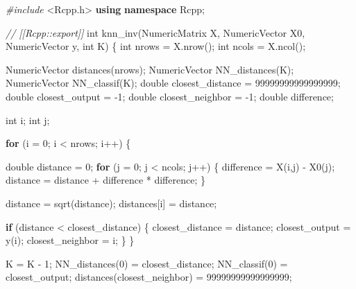 \documentclass[]{article}
\newenvironment{Shaded}{\begin{snugshade}}{\end{snugshade}}
\newcommand{\CommentTok}[1]{\textcolor[rgb]{0.56,0.35,0.01}{\textit{#1}}}
\newcommand{\ControlFlowTok}[1]{\textcolor[rgb]{0.13,0.29,0.53}{\textbf{#1}}}
\newcommand{\DataTypeTok}[1]{\textcolor[rgb]{0.13,0.29,0.53}{#1}}
\newcommand{\DecValTok}[1]{\textcolor[rgb]{0.00,0.00,0.81}{#1}}
\newcommand{\ImportTok}[1]{#1}
\newcommand{\KeywordTok}[1]{\textcolor[rgb]{0.13,0.29,0.53}{\textbf{#1}}}
\newcommand{\NormalTok}[1]{#1}
\newcommand{\PreprocessorTok}[1]{\textcolor[rgb]{0.56,0.35,0.01}{\textit{#1}}}
\begin{document}
\begin{Shaded}
\begin{Highlighting}[]
\PreprocessorTok{#include }\ImportTok{<Rcpp.h>}
\KeywordTok{using} \KeywordTok{namespace}\NormalTok{ Rcpp;}

\CommentTok{// [[Rcpp::export]]}
\DataTypeTok{int}\NormalTok{ knn_inv(NumericMatrix X, NumericVector X0, NumericVector y, }\DataTypeTok{int}\NormalTok{ K) \{}
    \DataTypeTok{int}\NormalTok{ nrows = X.nrow();}
    \DataTypeTok{int}\NormalTok{ ncols = X.ncol();}

\NormalTok{    NumericVector distances(nrows);}
\NormalTok{    NumericVector NN_distances(K);}
\NormalTok{    NumericVector NN_classif(K);}
    \DataTypeTok{double}\NormalTok{ closest_distance = }\DecValTok{99999999999999999}\NormalTok{;}
    \DataTypeTok{double}\NormalTok{ closest_output = -}\DecValTok{1}\NormalTok{;}
    \DataTypeTok{double}\NormalTok{ closest_neighbor = -}\DecValTok{1}\NormalTok{;}
    \DataTypeTok{double}\NormalTok{ difference;}

    \DataTypeTok{int}\NormalTok{ i;}
    \DataTypeTok{int}\NormalTok{ j;}
    
    \ControlFlowTok{for}\NormalTok{ (i = }\DecValTok{0}\NormalTok{; i < nrows; i++) \{}
        
        \DataTypeTok{double}\NormalTok{ distance = }\DecValTok{0}\NormalTok{;}
        \ControlFlowTok{for}\NormalTok{ (j = }\DecValTok{0}\NormalTok{; j < ncols; j++) \{}
\NormalTok{            difference = X(i,j) - X0(j);}
\NormalTok{            distance = distance + difference * difference;}
\NormalTok{        \}}

\NormalTok{        distance = sqrt(distance);}
\NormalTok{        distances[i] = distance;}

        \ControlFlowTok{if}\NormalTok{ (distance < closest_distance) \{}
\NormalTok{            closest_distance = distance;}
\NormalTok{            closest_output = y(i);}
\NormalTok{            closest_neighbor = i;}
\NormalTok{        \}}
\NormalTok{    \}}

\NormalTok{    K = K - }\DecValTok{1}\NormalTok{;}
\NormalTok{    NN_distances(}\DecValTok{0}\NormalTok{) = closest_distance;}
\NormalTok{    NN_classif(}\DecValTok{0}\NormalTok{) = closest_output;}
\NormalTok{    distances(closest_neighbor) = }\DecValTok{99999999999999999}\NormalTok{;}
    

\end{Highlighting}
\end{Shaded}
\end{document}
